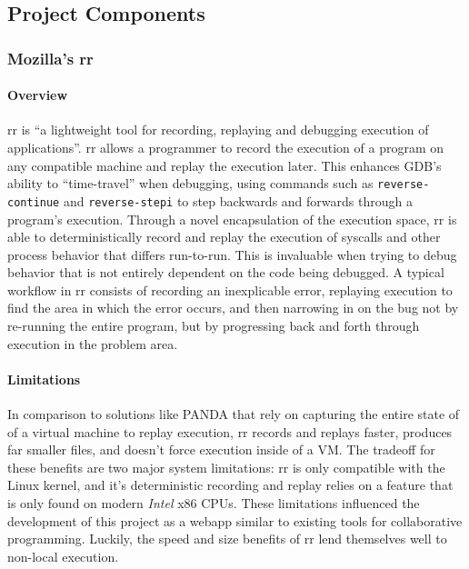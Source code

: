 \documentclass[12pt]{article}
\begin{document}
\subsection{Project Components}

\subsubsection{Mozilla's rr}

\paragraph{Overview}

rr is ``a lightweight tool for recording, replaying and debugging
execution of applications''.\cite{rr-repo} rr allows a programmer to
record the execution of a program on any compatible machine and replay
the execution later.  This enhances GDB's ability to ``time-travel''
when debugging, using commands such as \lstinline{reverse-continue}
and \lstinline{reverse-stepi}\cite{gdbman} to step backwards and
forwards through a program's execution.  Through a novel encapsulation
of the execution space, rr is able to deterministically record and
replay the execution of syscalls and other process behavior that
differs run-to-run.  This is invaluable when trying to debug behavior
that is not entirely dependent on the code being debugged.  A typical
workflow in rr consists of recording an inexplicable error, replaying
execution to find the area in which the error occurs, and then
narrowing in on the bug not by re-running the entire program, but by
progressing back and forth through execution in the problem area.

\paragraph{Limitations}

In comparison to solutions like PANDA\cite{10.1145/2843859.2843867}
that rely on capturing the entire state of of a virtual machine to
replay execution, rr records and replays faster, produces far smaller
files, and doesn't force execution inside of a
VM.\cite{DBLP:journals/corr/OCallahanJFHNP17} The tradeoff for these
benefits are two major system limitations: rr is only compatible with
the Linux kernel, and it's deterministic recording and replay relies
on a feature that is only found on modern \textit{Intel} x86 CPUs.
These limitations influenced the development of this project as a
webapp similar to existing tools for collaborative programming.
Luckily, the speed and size benefits of rr lend themselves well to
non-local execution.
\end{document}
